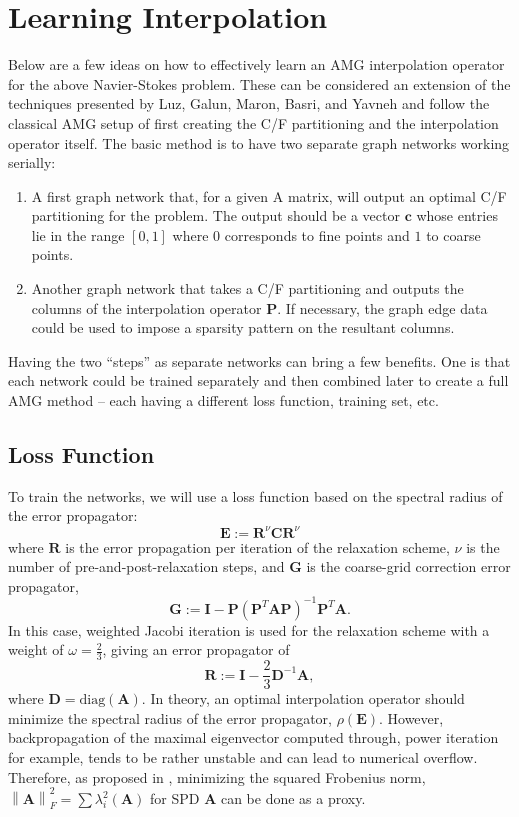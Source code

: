 \documentclass{article}
\newcommand{\norm}[1]{\left\lVert#1\right\rVert}
\newcommand{\mat}[1]{\bm{{#1}}}
\renewcommand{\vec}[1]{\bm{{#1}}}
\begin{document}
\section{Learning Interpolation}
Below are a few ideas on how to effectively learn an AMG interpolation operator for the above Navier-Stokes problem.  These can be considered an extension of the techniques presented by Luz, Galun, Maron, Basri, and Yavneh \cite{luz2020learning} and follow the classical AMG setup of first creating the C/F partitioning and the interpolation operator itself.  The basic method is to have two separate graph networks working serially:
\begin{enumerate}
\item A first graph network that, for a given A matrix, will output an optimal C/F partitioning for the problem.  The output should be a vector $\vec{c}$ whose entries lie in the range $\left[0,1\right]$ where $0$ corresponds to fine points and $1$ to coarse points.
\item Another graph network that takes a C/F partitioning and outputs the columns of the interpolation operator $\mat{P}$.  If necessary, the graph edge data could be used to impose a sparsity pattern on the resultant columns.
\end{enumerate}

Having the two ``steps'' as separate networks can bring a few benefits.  One is that each network could be trained separately and then combined later to create a full AMG method -- each having a different loss function, training set, etc.
\subsection{Loss Function}
To train the networks, we will use a loss function based on the spectral radius of the error propagator:
\begin{equation}
  \mat{E} := \mat{R}^\nu \mat{C} \mat{R}^\nu
\end{equation}
where $\mat{R}$ is the error propagation per iteration of the relaxation scheme, $\nu$ is the number of pre-and-post-relaxation steps, and $\mat{G}$ is the coarse-grid correction error propagator,
\begin{equation}
  \mat{G} := \mat{I} - \mat{P} \left( \mat{P}^T \mat{A} \mat{P} \right)^{-1} \mat{P}^T \mat{A}.
\end{equation}
In this case, weighted Jacobi iteration is used for the relaxation scheme with a weight of $\omega=\frac{2}{3}$, giving an error propagator of
\begin{equation}
  \mat{R} := \mat{I} - \frac{2}{3}\mat{D}^{-1}\mat{A},
\end{equation}
where $\mat{D}=\text{diag}\left(\mat{A}\right)$.  In theory, an optimal interpolation operator should minimize the spectral radius of the error propagator, $\rho\left(\mat{E}\right)$.  However, backpropagation of the maximal eigenvector computed through, power iteration for example, tends to be rather unstable and can lead to numerical overflow\cite{wang2019backpropagationfriendly}.  Therefore, as proposed in \cite{luz2020learning}, minimizing the squared Frobenius norm, $\norm{\mat{A}}_F^2=\sum\lambda^2_i\left(\mat{A}\right)$ for SPD $\mat{A}$ can be done as a proxy.
\end{document}
